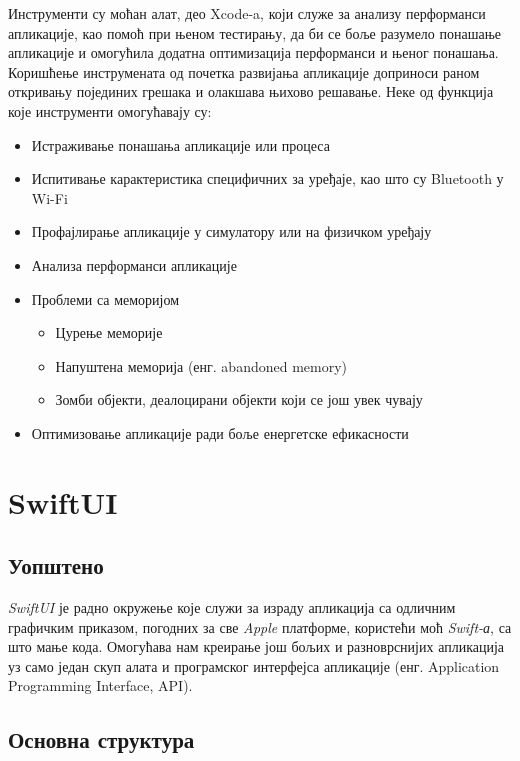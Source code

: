 \documentclass[12pt,oneside]{memoir}
\begin{document}
\indent Инструменти су моћан алат, део Xcode-a, који служе за анализу перформанси апликације, као помоћ при њеном тестирању, да би се боље разумело понашање апликације и омогућила додатна оптимизација перформанси и њеног понашања. Коришћење инструмената од почетка развијања апликације доприноси раном откривању појединих грешака и олакшава њихово решавање. 
Неке од функција које инструменти омогућавају су:
\begin{itemize}
    \item Истраживање понашања апликације или процеса
    \item Испитивање карактеристика специфичних за уређаје, као што су Bluetooth у Wi-Fi
    \item Профајлирање апликације у симулатору или на физичком уређају
    \item Анализа перформанси апликације
    \item Проблеми са меморијом
    
    \begin{itemize}
        \item Цурење меморије
        \item Напуштена меморија (енг. abandoned memory)
        \item Зомби објекти, деалоцирани објекти који се још увек чувају 
    \end{itemize}
    
    \item Оптимизовање апликације ради боље енергетске ефикасности
\end{itemize}

\section{SwiftUI}
\label{sec:SwiftUI}

\subsection{Уопштено}

\indent \textit{SwiftUI} је радно окружење које служи за израду апликација са одличним графичким приказом, погодних за све \textit{Apple} платформе, користећи моћ \textit{Swift-а}, са што мање кода. Омогућава нам креирање још бољих и разноврснијих апликација уз само један скуп алата и програмског интерфејса апликације (енг. Application Programming Interface, API). 

\subsection{Основна структура}
\end{document}

